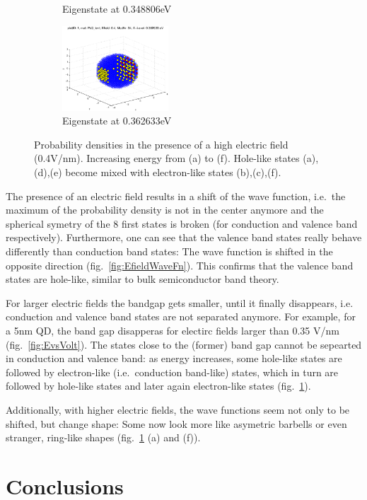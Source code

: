 \begin{figure}
\begin{subfigure}{150px}
		\caption{Eigenstate at 0.348806eV}
	\end{subfigure}
	\begin{subfigure}{150px}
		\includegraphics[width=150px]{Fig/Plots/r25v04Mod34}
		\caption{Eigenstate at 0.362633eV}
	\end{subfigure}
	\caption{Probability densities in the presence of a high electric field (0.4V/nm). Increasing energy from (a) to (f). Hole-like states (a),(d),(e) become mixed with electron-like states (b),(c),(f).}
	\label{fig:HighEfieldWaveFn}
\end{figure}


The presence of an electric field results in a shift of the wave function, i.e.~the maximum of the probability density is not in the center anymore and the spherical symetry of the 8 first states is broken (for conduction and valence band respectively). Furthermore, one can see that the valence band states really behave differently than conduction band states: The wave function is shifted in the opposite direction (fig.~\ref{fig:EfieldWaveFn}). This confirms that the valence band states are hole-like, similar to bulk semiconductor band theory. 
	
For larger electric fields the bandgap gets smaller, until it finally disappears, i.e. conduction and valence band states are not separated anymore. For example, for a 5nm  QD, the band gap disapperas for electirc fields larger than 0.35 V/nm (fig.~\ref{fig:EvsVolt}). The states close to the (former) band gap cannot be sepearted in conduction and valence band: as energy increases, some hole-like states are followed by electron-like (i.e.~conduction band-like) states, which in turn are followed by hole-like states and later again electron-like states (fig.~\ref{fig:HighEfieldWaveFn}).
	
Additionally, with higher electric fields, the wave functions seem not only to be shifted, but change shape: Some now look more like asymetric barbells or even stranger, ring-like shapes (fig.~\ref{fig:HighEfieldWaveFn} (a) and (f)).

\FloatBarrier

\section{Conclusions}



